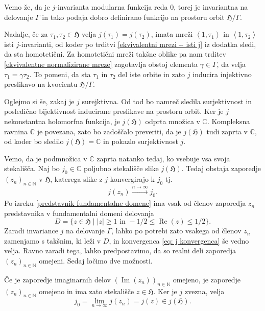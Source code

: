 \documentclass[mat1]{fmfdelo}
\numberwithin{equation}{section}
\newcommand{\N}{\mathbb N}
\newcommand{\C}{\mathbb C}
\newcommand{\HH}{\mathfrak{H}}
\newcommand{\SL}{\Gamma}
\newcommand{\abs}[1]{\left\lvert #1 \right\rvert}
\newcommand{\lattice}[2]{\left\langle #1, #2 \right\rangle}
\renewcommand\Re{\operatorname{Re}}%
\renewcommand\Im{\operatorname{Im}}%
\newcommand{\tj}{tj.\ }
\theoremstyle{definition}
\begin{document}
\begin{dokaz}
    Vemo že, da je $j$-invarianta modularna funkcija reda $0$, torej je invariantna na delovanje $\SL$ in tako podaja dobro definirano funkcijo na prostoru orbit $\HH/\SL$. 
    
    Nadalje, če za $\tau_1, \tau_2 \in \HH$ velja $j(\tau_1) = j(\tau_2)$, imata mreži $\lattice{1}{\tau_1}$ in $\lattice{1}{\tau_2}$ isti $j$-invarianti, od koder po trditvi \ref{ekvivalentni mrezi -- isti j} iz dodatka sledi, da sta homotetični. Za homotetični mreži takšne oblike pa nam trditev \ref{ekvivalentne normalizirane mreze} zagotavlja obstoj elementa $\gamma \in \SL$, da velja $\tau_1 = \gamma \tau_2$. To pomeni, da sta $\tau_1$ in $\tau_2$ del iste orbite in zato $j$ inducira injektivno preslikavo na kvocientu $\HH/\SL$.

    Oglejmo si še, zakaj je $j$ surejktivna. Od tod bo namreč sledila surjektivnost in posledično bijektivnost inducirane preslikave na prostoru orbit. Ker je $j$ nekonstantna holomorfna funkcija, je $j(\HH)$ odprta množica v $\C$. Kompleksna ravnina $\C$ je povezana, zato bo zadoščalo preveriti, da je $j(\HH)$ tudi zaprta v $\C$, od koder bo sledilo $j(\HH) = \C$ in pokazlo surjektivnost $j$. 

    Vemo, da je podmnožica v $\C$ zaprta natanko tedaj, ko vsebuje vsa svoja stekališča. Naj bo $j_0 \in \C$ poljubno stekališče slike $j(\HH)$. Tedaj obstaja zaporedje $(z_n)_{n\in \N}$ v $\HH$, katerega slike z $j$ konvergirajo k $j_0$ \tj 
    \begin{equation}
        \label{eq: j konvergenca}
        j(z_n) \xrightarrow[]{n \to \infty} j_0. 
    \end{equation}
    Po izreku \ref{predstavnik fundamentalne domene} ima vsak od členov zaporedja $z_n$ predstavnika v fundamentalni domeni delovanja 
    \[
        D = \{z \in \HH \mid \abs{z} \geq 1 \text{ in } -1/2\leq \Re(z) \leq 1/2\}. 
    \]
    Zaradi invariance $j$ na delovanje $\SL$, lahko po potrebi zato vsakega od členov $z_n$ zamenjamo s takšnim, ki leži v $D$, in konvergenca \eqref{eq: j konvergenca} še vedno velja. 
    Ravno zaradi tega, lahko predpostavimo, da so realni deli zaporedja $(z_n)_{n\in \N}$ omejeni. Sedaj ločimo dve možnosti.

    Če je zaporedje imaginarnih delov $(\Im(z_n))_{n \in \N}$ omejeno, je zaporedje $(z_n)_{n\in \N}$ omejeno in ima zato stekališče $z \in \HH$. Ker je $j$ zvezna, velja
    \[
        j_0 = \lim_{n \to \infty}j(z_n) = j(z) \in j(\HH).  
    \] 


\end{dokaz}
\end{document}
